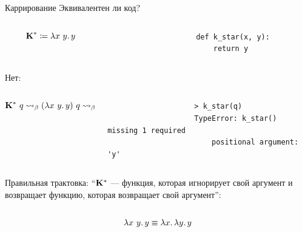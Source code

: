     \begin{frame}[fragile]{Каррирование}
        \vspace{-0.5em}
        Эквивалентен ли код?
        \vspace{-1em}
        \begin{columns}[onlytextwidth]
            \begin{column}[t]{0.485\textwidth}
                \vspace{0.2 em}
                \[\textbf{K}^* \coloneqq \lambda x~y\ldotp y\]
            \end{column}\hfill%
            \begin{column}[t]{0.485\textwidth}
                \begin{verbatim}
                    def k_star(x, y):
                        return y
                \end{verbatim}
            \end{column}
        \end{columns}
        \pause
        Нет:
        \vspace{-2em}
        \begin{columns}[onlytextwidth]
            \begin{column}[t]{0.485\textwidth}
                \vspace{0.5em}
                \[\mathbf{K}^* ~ q \rightsquigarrow_\beta (\lambda x~y\ldotp y) ~ q \rightsquigarrow_\beta \lambda y\ldotp y \]
            \end{column}\hfill%
            \begin{column}[t]{0.485\textwidth}
                \begin{verbatim}
                    > k_star(q)
                    TypeError: k_star() missing 1 required
                        positional argument: 'y'
                \end{verbatim}
            \end{column}
        \end{columns}
        \pause
        \vspace{0.3em}
        Правильная трактовка: ``$\mathbf{K}^*$ --- функция, которая игнорирует свой аргумент и возвращает
        функцию, которая возвращает свой аргумент'':
        \vspace{-1.5em}
        \begin{columns}[onlytextwidth]
            \begin{column}[t]{0.485\textwidth}
                \vspace{0.5em}
                \[\lambda x~y\ldotp y \equiv \lambda x\ldotp \lambda y\ldotp y\]

\end{column}
\end{columns}
\end{frame}

